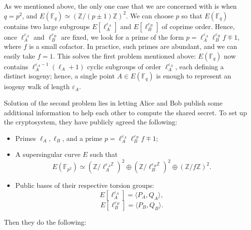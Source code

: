 \documentclass{article}
\theoremstyle{theorem}
\theoremstyle{definition}
\begin{document}
As we mentioned above, the only one case that we are concerned with is when $q = p^2$, and $E(\mathbb{F}_q) \simeq (\mathbb{Z}/(p \pm 1)\mathbb{Z})^2$. We can choose $p$ so that $E(\mathbb{F}_q)$ contains two large subgroups $E[\ell_A^{\varepsilon_A}]$ and $E[\ell_B^{\varepsilon_B}]$ of coprime order. Hence, once $\ell_A^{\varepsilon_A}$ and $\ell_B^{\varepsilon_B}$ are fixed, we look for a prime of the form $p = \ell_A^{\varepsilon_A} \ell_B^{\varepsilon_B}f \mp 1$, where $f$ is a small cofactor. In practice, such primes are abundant, and we can easily take $f = 1$. This solves the first problem mentioned above: $E(\mathbb{F}_q)$ now contains $\ell_A^{\varepsilon_A - 1}(\ell_A + 1)$  cyclic subgroups of order $\ell_A^{\varepsilon_A}$, each defining a distinct isogeny; hence, a single point $A \in E(\mathbb{F}_q)$ is enough to represent an isogeny walk of length $\varepsilon_A$.

Solution of the second problem lies in letting Alice and Bob publish some additional information to help each other to compute the shared secret. To set up the cryptosystem, they have publicly agreed the following:

\begin{itemize}
	\item Primes $\ell_A, \ell_B$, and a prime $p = \ell_A^{\varepsilon_A}\ell_B^{\varepsilon_B}f \mp 1$;
	
	\item A supersingular curve $E$ such that
		\[E(\mathbb{F}_{p^2}) \simeq (\mathbb{Z}/\ell_A^{\varepsilon_A\mathbb{Z}})^2 \oplus (\mathbb{Z}/\ell_B^{\varepsilon_B\mathbb{Z}})^2 \oplus (\mathbb{Z}/f\mathbb{Z})^2. \]
		
	\item Public bases of their respective torsion groups:
		\[ E[\ell_A^{\varepsilon_A}] = \langle P_A, Q_A \rangle, \]
		\[ E[\ell_B^{\varepsilon_B}] = \langle P_B, Q_B \rangle. \]
\end{itemize}

Then they do the following:
\end{document}
